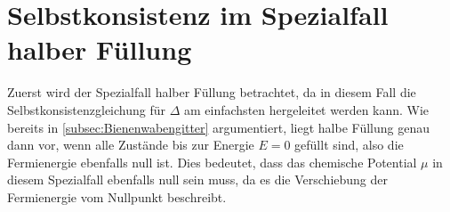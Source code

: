 



























\section{Selbstkonsistenz im Spezialfall halber Füllung}

Zuerst wird der Spezialfall halber Füllung betrachtet, da in diesem Fall die Selbstkonsistenzgleichung für $\Delta$ am einfachsten hergeleitet werden kann. 
Wie bereits in \autoref{subsec:Bienenwabengitter} argumentiert, liegt halbe Füllung genau dann vor, wenn alle Zustände bis zur Energie $E=0$ gefüllt sind, also die Fermienergie ebenfalls null ist.
Dies bedeutet, dass das chemische Potential $\mu$ in diesem Spezialfall ebenfalls null sein muss, da es die Verschiebung der Fermienergie vom Nullpunkt beschreibt.

